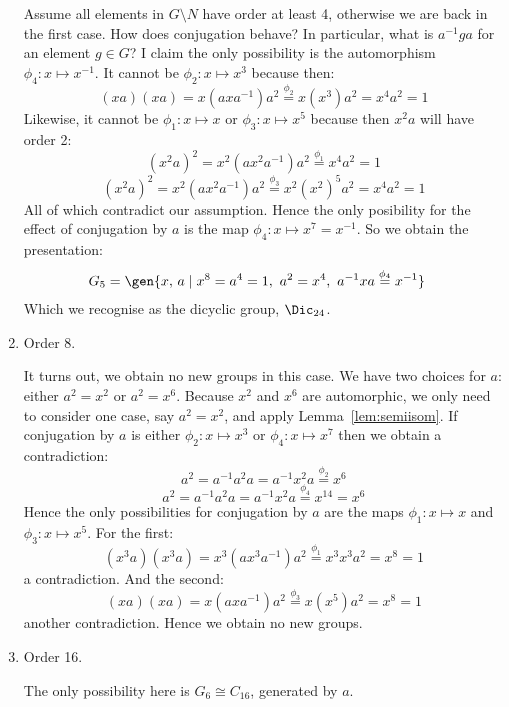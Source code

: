 \begin{enumerate}
        Assume all elements in \(G\setminus N\) have order at least 4, otherwise we are back in the first case.
        How does conjugation behave?
        In particular, what is \(a^{-1}ga\) for an element \(g \in G\)?
        I claim the only possibility is the automorphism \(\phi_4:x\mapsto x^{-1}\).
        It cannot be \(\phi_2:x\mapsto x^3\) because then:
        \[(xa)(xa) = x(axa^{-1})a^2 \overset{\phi_2}{=} x(x^3) a^2 = x^4 a^2 = 1\]
        Likewise, it cannot be \(\phi_1:x\mapsto x\) or \(\phi_3:x\mapsto x^5\) because then \(x^2 a\) will have order 2:
        \[{(x^2 a)}^2 = x^2 (ax^2 a^{-1})a^2 \overset{\phi_1}{=} x^4 a^2 = 1\]
        \[{(x^2 a)}^2 = x^2 (ax^2 a^{-1})a^2 \overset{\phi_3}{=} x^2 {(x^2)}^5 a^2 = x^4 a^2 = 1\]
        All of which contradict our assumption.
        Hence the only posibility for the effect of conjugation by \(a\) is the map \(\phi_4:x\mapsto x^7 = x^{-1}\).
        So we obtain the presentation:
        \begin{align*}
            G_5 &= \gen{x,\,a \mid x^8 = a^4 = 1,\ a^2 = x^4,\ a^{-1}xa \overset{\phi_4}{=} x^{-1}}
        \end{align*}
        Which we recognise as the dicyclic group, \(\Dic_{24}\).
    \item Order 8.

        It turns out, we obtain no new groups in this case.
        We have two choices for \(a\): either \(a^2 = x^2\) or \(a^2 = x^6\).
        Because \(x^2\) and \(x^6\) are automorphic, we only need to consider one case, say \(a^2 = x^2\), and apply
        Lemma~\ref{lem:semiisom}.
        If conjugation by \(a\) is either \(\phi_2:x\mapsto x^3\) or \(\phi_4:x\mapsto x^7\) then we obtain a
        contradiction:
        \[a^2 = a^{-1}a^2 a = a^{-1}x^2 a \overset{\phi_2}{=} x^6\]
        \[a^2 = a^{-1}a^2 a = a^{-1}x^2 a \overset{\phi_4}{=} x^{14} = x^6\]
        Hence the only possibilities for conjugation by \(a\) are the maps \(\phi_1:x\mapsto x\) and \(\phi_3:x \mapsto
        x^5\).
        For the first:
        \[(x^3 a)(x^3 a) = x^3(ax^3 a^{-1})a^2 \overset{\phi_1}{=} x^3 x^3 a^2 = x^8 = 1\]
        a contradiction.
        And the second:
        \[(xa)(xa) = x(axa^{-1})a^2 \overset{\phi_3}{=} x(x^5)a^2 = x^8 = 1\]
        another contradiction.
        Hence we obtain no new groups.
    \item Order 16.

        The only possibility here is \(G_6 \cong C_{16}\), generated by \(a\).
\end{enumerate}

